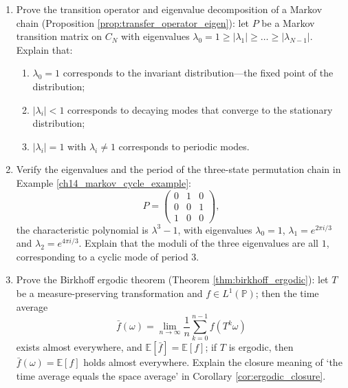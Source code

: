 \begin{enumerate}[leftmargin=3em, label=\textbf{Exercise \arabic*}]
    \item Prove the transition operator and eigenvalue decomposition of a Markov chain (Proposition \ref{prop:transfer_operator_eigen}):
    let $P$ be a Markov transition matrix on $C_N$ with eigenvalues
    $\lambda_0=1\ge|\lambda_1|\ge\dots\ge|\lambda_{N-1}|$.
    Explain that:
    \begin{enumerate}[label=(\roman*)]
        \item $\lambda_0=1$ corresponds to the invariant distribution---the fixed point of the distribution;
        \item $|\lambda_i|<1$ corresponds to decaying modes that converge to the stationary distribution;
        \item $|\lambda_i|=1$ with $\lambda_i\neq1$ corresponds to periodic modes.
    \end{enumerate}

    \item Verify the eigenvalues and the period of the three-state permutation chain in Example \ref{ch14_markov_cycle_example}:
    \[
    P=\begin{pmatrix}0&1&0\\0&0&1\\1&0&0\end{pmatrix},
    \]
    the characteristic polynomial is $\lambda^3-1$, with eigenvalues $\lambda_0=1$,
    $\lambda_1=e^{2\pi i/3}$ and $\lambda_2=e^{4\pi i/3}$.
    Explain that the moduli of the three eigenvalues are all $1$, corresponding to a cyclic mode of period $3$.

    \item Prove the Birkhoff ergodic theorem (Theorem \ref{thm:birkhoff_ergodic}):
    let $T$ be a measure-preserving transformation and $f\in L^1(\mathbb{P})$; then the time average
    \[
    \bar{f}(\omega)=\lim_{n\to\infty}\frac{1}{n}\sum_{k=0}^{n-1}f(T^k\omega)
    \]
    exists almost everywhere, and $\mathbb{E}[\bar{f}]=\mathbb{E}[f]$;
    if $T$ is ergodic, then $\bar{f}(\omega)=\mathbb{E}[f]$ holds almost everywhere.
    Explain the closure meaning of `the time average equals the space average' in Corollary \ref{cor:ergodic_closure}.


\end{enumerate}
